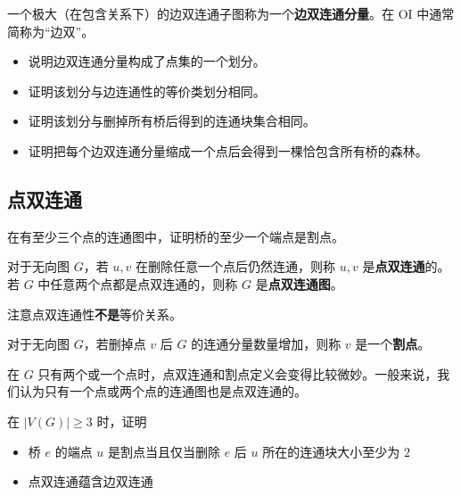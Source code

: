 \begin{definition}[边双连通分量]
    一个极大（在包含关系下）的边双连通子图称为一个\textbf{边双连通分量}。在 OI 中通常简称为“边双”。
\end{definition}
\begin{exercise}[边双缩点]
    \begin{itemize}
        \item 说明边双连通分量构成了点集的一个划分。
        \item 证明该划分与边连通性的等价类划分相同。
        \item 证明该划分与删掉所有桥后得到的连通块集合相同。
        \item 证明把每个边双连通分量缩成一个点后会得到一棵恰包含所有桥的森林。
    \end{itemize}
\end{exercise}

\subsection{点双连通}

\begin{exercise}
    在有至少三个点的连通图中，证明桥的至少一个端点是割点。
\end{exercise}

\begin{definition}[点双连通性]
    对于无向图 $G$，若 $u,v$ 在删除任意一个点后仍然连通，则称 $u,v$ 是\textbf{点双连通}的。若 $G$ 中任意两个点都是点双连通的，则称 $G$ 是\textbf{点双连通图}。
\end{definition}
\begin{remark}
    注意点双连通性\textbf{不是}等价关系。
\end{remark}
\begin{definition}[割点]
    对于无向图 $G$，若删掉点 $v$ 后 $G$ 的连通分量数量增加，则称 $v$ 是一个\textbf{割点}。
\end{definition}
\begin{remark}
    在 $G$ 只有两个或一个点时，点双连通和割点定义会变得比较微妙。一般来说，我们认为只有一个点或两个点的连通图也是点双连通的。
\end{remark}
\begin{exercise}
    在 $|V(G)|\ge 3$ 时，证明
    \begin{itemize}
        \item 桥 $e$ 的端点 $u$ 是割点当且仅当删除 $e$ 后 $u$ 所在的连通块大小至少为 $2$
        \item 点双连通蕴含边双连通
    \end{itemize}
\end{exercise}

